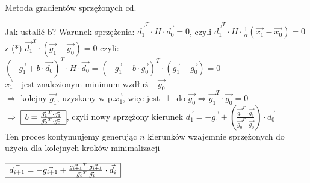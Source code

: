   \begin{frame}{Metoda gradientów sprzężonych cd. }

   \begin{block}{Jak ustalić b?}
	  Warunek sprzężenia: $\vec{d_1}^T \cdot H \cdot \vec{d_0}  = 0$,
	  czyli $\vec{d_1}^T \cdot H \cdot \frac{1}{\alpha}(\vec{x_1}-\vec{x_0}) = 0$
	  z (*) $\vec{d_1}^T  \cdot (\vec{g_1} - \vec{g_0})=0$ czyli:
	  $(-\vec{g_1} + b \cdot \vec{d_0})^T \cdot H \cdot \vec{d_0} = (-\vec{g_1} -b \cdot \vec{g_0})^T \cdot (\vec{g_1} - \vec{g_0}) = 0$
	  \\$\vec{x_1}$ - jest znalezionym minimum wzdłuż $-\vec{g_0}$\\ $\Rightarrow$
	  kolejny $\vec{g_1}$, uzyskany w p.$\vec{x_1}$, więc jest $\perp$ do $\vec{g_0}  \Rightarrow  \vec{g_1}^T \cdot \vec{g_0} = 0$
	  \smallskip
	  \\$\Rightarrow$
	  $\begin{array}{|c|}
 	   	 \hline
 	   	    b = \frac{\vec{g_1}^T \cdot \vec{g_1}}{\vec{g_0}^T \cdot \vec{g_0}}
 	   	 \\ \hline
	  \end{array}$,
 	  czyli nowy sprzężony kierunek $\vec{d_1} = -\vec{g_1} + \left(\frac{\vec{g_1}^T \cdot \vec{g_1}}{\vec{g_0}^T \cdot \vec{g_0}}\right) \cdot \vec{d_0} $
 	  \medskip
 	  \\Ten proces kontynuujemy generując $n$ kierunków  wzajemnie sprzężonych do użycia dla kolejnych kroków minimalizacji 
 	  \begin{center}
 	  	 $\begin{array}{|c|}
 	   	   \hline
 	   	      \vec{d_{i+1}} = -\vec{g_{i+1}} + \frac{\vec{g_{i+1}}^T \cdot \vec{g_{i+1}}}{\vec{g_{i}}^T \cdot \vec{g_{i}}} \cdot \vec{d_i}
 	   	   \\ \hline
	    \end{array}$
 	  \end{center}
 	
 	\end{block}

  \end{frame}
